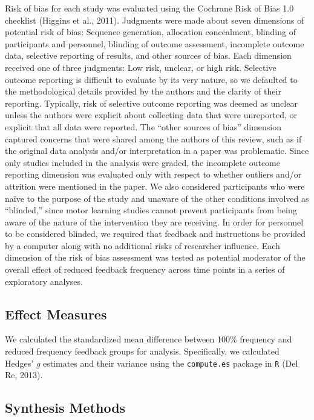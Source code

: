 \documentclass[
  english,
  man, donotrepeattitle,mask,floatsintext]{apa7}
\begin{document}
Risk of bias for each study was evaluated using the Cochrane Risk of Bias 1.0 checklist (Higgins et al., 2011). Judgments were made about seven dimensions of potential risk of bias: Sequence generation, allocation concealment, blinding of participants and personnel, blinding of outcome assessment, incomplete outcome data, selective reporting of results, and other sources of bias. Each dimension received one of three judgments: Low risk, unclear, or high risk. Selective outcome reporting is difficult to evaluate by its very nature, so we defaulted to the methodological details provided by the authors and the clarity of their reporting. Typically, risk of selective outcome reporting was deemed as unclear unless the authors were explicit about collecting data that were unreported, or explicit that all data were reported. The ``other sources of bias'' dimension captured concerns that were shared among the authors of this review, such as if the original data analysis and/or interpretation in a paper was problematic. Since only studies included in the analysis were graded, the incomplete outcome reporting dimension was evaluated only with respect to whether outliers and/or attrition were mentioned in the paper. We also considered participants who were naïve to the purpose of the study and unaware of the other conditions involved as ``blinded,'' since motor learning studies cannot prevent participants from being aware of the nature of the intervention they are receiving. In order for personnel to be considered blinded, we required that feedback and instructions be provided by a computer along with no additional risks of researcher influence. Each dimension of the risk of bias assessment was tested as potential moderator of the overall effect of reduced feedback frequency across time points in a series of exploratory analyses.

\hypertarget{effect-measures}{%
\subsection{Effect Measures}\label{effect-measures}}

We calculated the standardized mean difference between 100\% frequency and reduced frequency feedback groups for analysis. Specifically, we calculated Hedges' \emph{g} estimates and their variance using the \texttt{compute.es} package in \texttt{R} (Del Re, 2013).

\hypertarget{synthesis-methods}{%
\subsection{Synthesis Methods}\label{synthesis-methods}}
\end{document}
